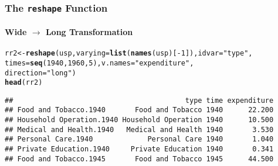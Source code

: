 \documentclass[paper=screen,mathserif]{beamer}\usepackage[]{graphicx}\usepackage[]{color}
\makeatletter
\newcommand{\hlnum}[1]{\textcolor[rgb]{0.686,0.059,0.569}{#1}}%
\newcommand{\hlstr}[1]{\textcolor[rgb]{0.192,0.494,0.8}{#1}}%
\newcommand{\hlopt}[1]{\textcolor[rgb]{0,0,0}{#1}}%
\newcommand{\hlstd}[1]{\textcolor[rgb]{0.345,0.345,0.345}{#1}}%
\newcommand{\hlkwb}[1]{\textcolor[rgb]{0.69,0.353,0.396}{#1}}%
\newcommand{\hlkwc}[1]{\textcolor[rgb]{0.333,0.667,0.333}{#1}}%
\newcommand{\hlkwd}[1]{\textcolor[rgb]{0.737,0.353,0.396}{\textbf{#1}}}%
\newenvironment{kframe}{%
 \def\at@end@of@kframe{}%
 \ifinner\ifhmode%
  \def\at@end@of@kframe{\end{minipage}}%
  \begin{minipage}{\columnwidth}%
 \fi\fi%
 \def\FrameCommand##1{\hskip\@totalleftmargin \hskip-\fboxsep
 \colorbox{shadecolor}{##1}\hskip-\fboxsep
     \hskip-\linewidth \hskip-\@totalleftmargin \hskip\columnwidth}%
 \MakeFramed {\advance\hsize-\width
   \@totalleftmargin\z@ \linewidth\hsize
   \@setminipage}}%
 {\par\unskip\endMakeFramed%
 \at@end@of@kframe}
\newenvironment{knitrout}{}{} %
\newcommand{\ft}[1]{\frametitle{#1}}
\newcommand{\fst}[1]{\framesubtitle{#1}}
\makeatother
\begin{document}
\begin{frame}[fragile]
  \ft{The {\tt reshape} Function}
  \fst{Wide $\rightarrow$ Long Transformation}

\begin{knitrout}\scriptsize
{}\color{fgcolor}\begin{kframe}
\begin{alltt}
\hlstd{rr2} \hlkwb{<-} \hlkwd{reshape}\hlstd{(usp,} \hlkwc{varying} \hlstd{=} \hlkwd{list}\hlstd{(}\hlkwd{names}\hlstd{(usp)[}\hlopt{-}\hlnum{1}\hlstd{]),} \hlkwc{idvar} \hlstd{=} \hlstr{"type"}\hlstd{,}
               \hlkwc{times} \hlstd{=} \hlkwd{seq}\hlstd{(}\hlnum{1940}\hlstd{,} \hlnum{1960}\hlstd{,} \hlnum{5}\hlstd{),} \hlkwc{v.names} \hlstd{=} \hlstr{"expenditure"}\hlstd{,}
               \hlkwc{direction} \hlstd{=} \hlstr{"long"}\hlstd{)}
\hlkwd{head}\hlstd{(rr2)}
\end{alltt}
\begin{verbatim}
##                                         type time expenditure
## Food and Tobacco.1940       Food and Tobacco 1940      22.200
## Household Operation.1940 Household Operation 1940      10.500
## Medical and Health.1940   Medical and Health 1940       3.530
## Personal Care.1940             Personal Care 1940       1.040
## Private Education.1940     Private Education 1940       0.341
## Food and Tobacco.1945       Food and Tobacco 1945      44.500
\end{verbatim}
\end{kframe}
\end{knitrout}
\end{frame}
\end{document}
